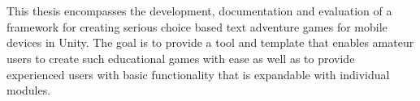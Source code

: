 \chapter{\abstractname}

This thesis encompasses the development, documentation and evaluation of a framework for creating serious choice based text adventure games for mobile devices in Unity. The goal is to provide a tool and template that enables amateur users to create such educational games with ease as well as to provide experienced users with basic functionality that is expandable with individual modules.